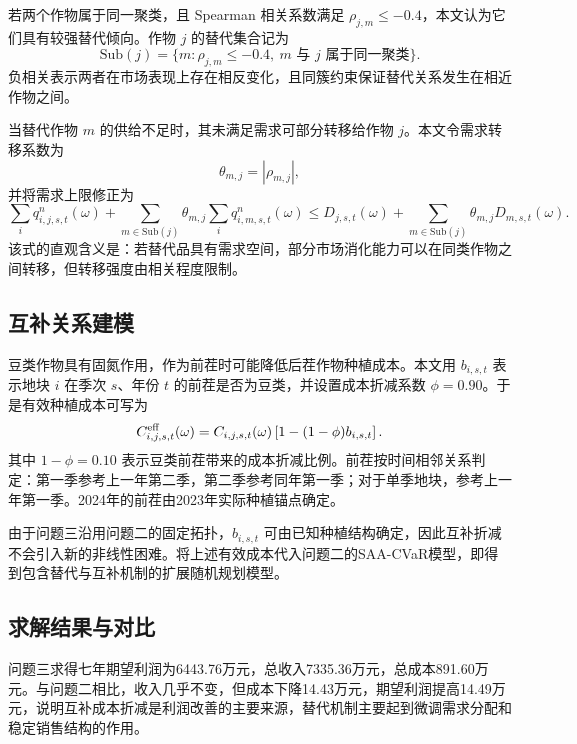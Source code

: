 若两个作物属于同一聚类，且 Spearman 相关系数满足 $\rho_{j,m}\le -0.4$，本文认为它们具有较强替代倾向。作物 $j$ 的替代集合记为
\begin{equation}
\mathrm{Sub}(j)=\{m:\rho_{j,m}\le -0.4,\ m\text{ 与 }j\text{ 属于同一聚类}\}.
\end{equation}
负相关表示两者在市场表现上存在相反变化，且同簇约束保证替代关系发生在相近作物之间。

当替代作物 $m$ 的供给不足时，其未满足需求可部分转移给作物 $j$。本文令需求转移系数为
\begin{equation}
\theta_{m,j}=|\rho_{m,j}|,
\end{equation}
并将需求上限修正为
\begin{equation}
\sum_i q^n_{i,j,s,t}(\omega)+
\sum_{m\in\mathrm{Sub}(j)}\theta_{m,j}\sum_i q^n_{i,m,s,t}(\omega)
\le D_{j,s,t}(\omega)+
\sum_{m\in\mathrm{Sub}(j)}\theta_{m,j}D_{m,s,t}(\omega).
\end{equation}
该式的直观含义是：若替代品具有需求空间，部分市场消化能力可以在同类作物之间转移，但转移强度由相关程度限制。

\subsection{互补关系建模}

豆类作物具有固氮作用，作为前茬时可能降低后茬作物种植成本。本文用 $b_{i,s,t}$ 表示地块 $i$ 在季次 $s$、年份 $t$ 的前茬是否为豆类，并设置成本折减系数 $\phi=0.90$。于是有效种植成本可写为
\begin{equation}
C^{\rm eff}_{i,j,s,t}(\omega)=C_{i,j,s,t}(\omega)\left[1-(1-\phi)b_{i,s,t}\right].
\end{equation}
其中 $1-\phi=0.10$ 表示豆类前茬带来的成本折减比例。前茬按时间相邻关系判定：第一季参考上一年第二季，第二季参考同年第一季；对于单季地块，参考上一年第一季。2024年的前茬由2023年实际种植锚点确定。

由于问题三沿用问题二的固定拓扑，$b_{i,s,t}$ 可由已知种植结构确定，因此互补折减不会引入新的非线性困难。将上述有效成本代入问题二的SAA-CVaR模型，即得到包含替代与互补机制的扩展随机规划模型。

\subsection{求解结果与对比}

问题三求得七年期望利润为6443.76万元，总收入7335.36万元，总成本891.60万元。与问题二相比，收入几乎不变，但成本下降14.43万元，期望利润提高14.49万元，说明互补成本折减是利润改善的主要来源，替代机制主要起到微调需求分配和稳定销售结构的作用。

